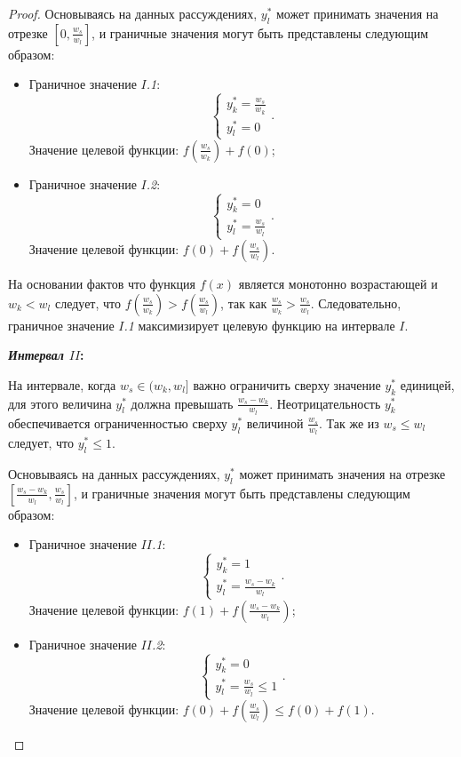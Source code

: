 \begin{proof}
Основываясь на данных рассуждениях, $y_l^{*}$ может принимать значения на отрезке $\left[0, \frac{w_s}{w_l}\right]$, и граничные значения могут быть представлены следующим образом:
\begin{itemize}
	\item Граничное значение \textit{$I$.1}:
		$$\begin{cases}
		y_k^{*} = \frac{w_s}{w_k}\\
		y_l^{*} = 0
		\end{cases}.$$
		Значение целевой функции: $f\left(\frac{w_s}{w_k}\right) + f(0)$;
	\item Граничное значение \textit{$I$.2}:
		$$\begin{cases}
		y_k^{*} = 0\\
		y_l^{*} = \frac{w_s}{w_l}
		\end{cases}.$$
		Значение целевой функции: $f(0) + f\left(\frac{w_s}{w_l}\right)$.
\end{itemize}

На основании фактов что функция $f(x)$ является монотонно возрастающей и $w_k < w_l$ следует, что $f\left(\frac{w_s}{w_k}\right) > f\left(\frac{w_s}{w_l}\right)$, так как $\frac{w_s}{w_k} > \frac{w_s}{w_l}$. Следовательно, граничное значение \textit{$I$.1} максимизирует целевую функцию на интервале $I$.

\textbf{\textit{Интервал $II$}:}

На интервале, когда $w_s \in (w_k, w_l]$ важно ограничить сверху значение $y_k^{*}$ единицей, для этого величина $y_l^{*}$ должна превышать $\frac{w_s - w_k}{w_l}$. Неотрицательность $y_k^{*}$ обеспечивается ограниченностью сверху $y_l^{*}$ величиной $\frac{w_s}{w_l}$. Так же из $w_s \leq w_l$ следует, что $y_l^{*} \leq 1$.

Основываясь на данных рассуждениях, $y_l^{*}$ может принимать значения на отрезке $\left[\frac{w_s - w_k}{w_l}, \frac{w_s}{w_l}\right]$, и граничные значения могут быть представлены следующим образом:

\begin{itemize}
	\item Граничное значение \textit{$II$.1}:
		$$\begin{cases}
		y_k^{*} = 1 \\
		y_l^{*} = \frac{w_s - w_k}{w_l}
		\end{cases}.$$
		Значение целевой функции: $f(1) + f\left(\frac{w_s - w_k}{w_l}\right)$;
	\item Граничное значение \textit{$II$.2}:
		$$\begin{cases}
		y_k^{*} = 0\\
		y_l^{*} = \frac{w_s}{w_l} \leq 1
		\end{cases}.$$
		Значение целевой функции: $f(0) + f\left(\frac{w_s}{w_l}\right) \leq f(0) + f(1)$.
\end{itemize}


\end{proof}
